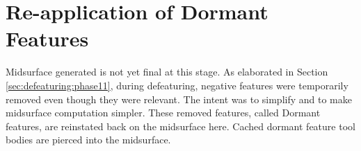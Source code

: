 

\section{Re-application of Dormant Features}

Midsurface generated is not yet final at this stage. As elaborated in Section \ref{sec:defeaturing:phase11}, during defeaturing, negative features were temporarily removed even though they were relevant. The intent was to simplify and to make midsurface computation simpler. These removed features, called Dormant features, are reinstated back on the midsurface here. Cached dormant feature tool bodies are pierced into the midsurface.




